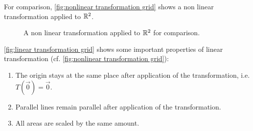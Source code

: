 For comparison, \autoref{fig:nonlinear transformation grid} shows a non linear transformation applied to $\mathbb{R}^{2}$.

\begin{figure}
	\centering
	\caption{A non linear transformation applied to $\mathbb{R}^{2}$ for comparison.}
	\label{fig:nonlinear transformation grid}
\end{figure}

\autoref{fig:linear transformation grid} shows some important properties of linear transformation (cf. \autoref{fig:nonlinear transformation grid}):
\begin{enumerate}
	\item The origin stays at the same place after application of the transformation, i.e. $T\left(\vec{0}\right) = \vec{0}$.
	\item Parallel lines remain parallel after application of the transformation.
	\item All areas are scaled by the same amount.
\end{enumerate}

